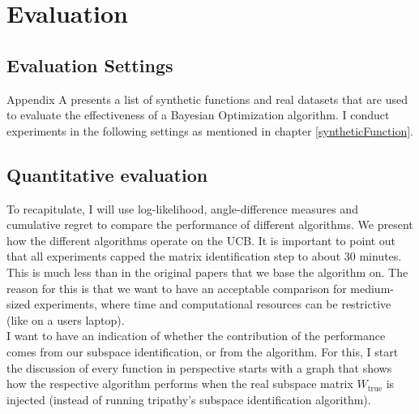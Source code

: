 \chapter{Evaluation}

\ifpdf
    \graphicspath{{07_Chapter6/Figs/Raster/}{07_Chapter6/Figs/PDF/}{07_Chapter6/Figs/}}
\else
    \graphicspath{{07_Chapter6/Figs/Vector/}{07_Chapter6/Figs/}}
\fi

\section{Evaluation Settings}

Appendix A presents a list of synthetic functions and real datasets that are used to evaluate the effectiveness of a Bayesian Optimization algorithm. 
I conduct experiments in the following settings as mentioned in chapter \ref{syntheticFunction}.

\section{Quantitative evaluation}
To recapitulate, I will use log-likelihood, angle-difference measures and cumulative regret to compare the performance of different algorithms.
We present how the different algorithms operate on the UCB.
It is important to point out that all experiments capped the matrix identification step to about 30 minutes.
This is much less than in the original papers that we base the algorithm on.
The reason for this is that we want to have an acceptable comparison for medium-sized experiments, where time and computational resources can be restrictive (like on a users laptop). \\

I want to have an indication of whether the contribution of the performance comes from our subspace identification, or from the algorithm. 
For this, I start the discussion of every function in perspective starts with a graph that shows how the respective algorithm performs when the real subspace matrix $W_{\text{true}}$ is injected (instead of running tripathy's subspace identification algorithm). \\

